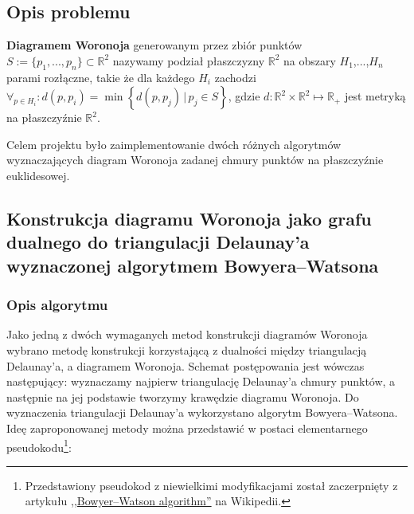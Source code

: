 \documentclass{myclass}
\begin{document}
\subsection{Opis problemu}
\textbf{Diagramem Woronoja} generowanym przez zbiór punktów
\(S:=\{p_1,...,p_n\}\subset \mathbb{R}^2\) nazywamy podział płaszczyzny
\(\mathbb{R}^2\) na obszary \(H_1\),...,\(H_n\) parami rozłączne, takie że dla
każdego \(H_i\) zachodzi \(\forall_{p\in H_i}: d(p,p_i) = \min\left\{d(p,p_j) \,
| \, p_j\in S\right\} \),  gdzie \(d:\mathbb{R}^2\times\mathbb{R}^2\mapsto
\mathbb{R}_+\) jest metryką na płaszczyźnie \(\mathbb{R}^2\).

Celem projektu było zaimplementowanie dwóch różnych algorytmów wyznaczających diagram Woronoja zadanej chmury punktów na płaszczyźnie euklidesowej.

\subsection{Konstrukcja diagramu Woronoja jako grafu dualnego do triangulacji Delaunay'a wyznaczonej algorytmem Bowyera--Watsona}

\subsubsection{Opis algorytmu}

Jako jedną z dwóch wymaganych metod konstrukcji diagramów Woronoja wybrano
metodę konstrukcji korzystającą z dualności między triangulacją Delaunay'a, a
diagramem Woronoja. Schemat postępowania jest wówczas następujący: wyznaczamy
najpierw triangulację Delaunay'a chmury punktów, a następnie na jej podstawie
tworzymy krawędzie diagramu Woronoja. Do wyznaczenia triangulacji Delaunay'a
wykorzystano algorytm Bowyera--Watsona. Ideę zaproponowanej metody można
przedstawić w postaci elementarnego pseudokodu\footnote{Przedstawiony pseudokod
z niewielkimi modyfikacjami został zaczerpnięty z artykułu \href{https://en.wikipedia.org/wiki/Bowyer\%E2\%80\%93Watson_algorithm\#Pseudocode}{,,Bowyer--Watson algorithm''} na Wikipedii.}:
\end{document}
